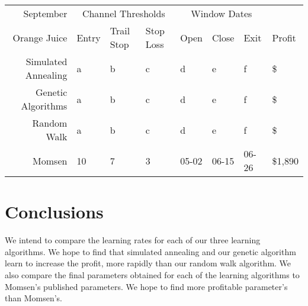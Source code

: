 \documentclass[12pt]{article}
\begin{document}
\begin{tabular}{|r|l|l|l|l|l|l|l|}
  \hline
  September    & \multicolumn{3}{|c|}{Channel Thresholds} & \multicolumn{3}{|c|}{Window Dates} &  \\
  Orange Juice & Entry & Trail Stop & Stop Loss & Open & Close & Exit & Profit\\ \hline
  Simulated Annealing & a & b & c & d & e & f & \$ \\ \hline
  Genetic Algorithms & a & b & c & d & e & f & \$ \\ \hline
  Random Walk & a & b & c & d & e & f & \$ \\ \hline
  Momsen & 10 & 7 & 3 & 05-02 & 06-15 & 06-26 & \$1,890 \\ \hline
\end{tabular}

\section{Conclusions}

We intend to compare the learning rates for each of our three learning
algorithms. We hope to find that simulated annealing and our genetic algorithm
learn to increase the profit, more rapidly than our random walk algorithm. We
also compare the final parameters obtained for each of the learning algorithms
to Momsen's published parameters. We hope to find more profitable parameter's
than Momsen's.




\nocite{*}
\end{document}
